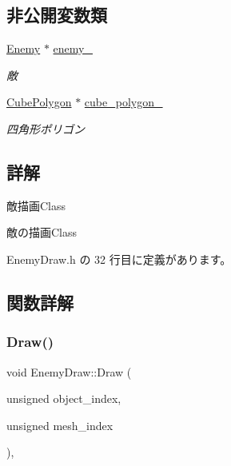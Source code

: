 \subsection*{非公開変数類}
\begin{DoxyCompactItemize}
\item 
\mbox{\hyperlink{class_enemy}{Enemy}} $\ast$ \mbox{\hyperlink{class_enemy_draw_a95b8a7f07e810d1347f1704669c8f790}{enemy\+\_\+}}
\begin{DoxyCompactList}\small\item\em 敵 \end{DoxyCompactList}\item 
\mbox{\hyperlink{class_cube_polygon}{Cube\+Polygon}} $\ast$ \mbox{\hyperlink{class_enemy_draw_a4f35f850ee5e41bb43fc6979e83589dd}{cube\+\_\+polygon\+\_\+}}
\begin{DoxyCompactList}\small\item\em 四角形ポリゴン \end{DoxyCompactList}\end{DoxyCompactItemize}


\subsection{詳解}
敵描画\+Class 

敵の描画\+Class 

 Enemy\+Draw.\+h の 32 行目に定義があります。



\subsection{関数詳解}
\mbox{\label{class_enemy_draw_a20a23c1c5fd5e510d15e8ca27aabd821}} 
\subsubsection{\texorpdfstring{Draw()}{Draw()}}
{\footnotesize\ttfamily void Enemy\+Draw\+::\+Draw (\begin{DoxyParamCaption}\item[{unsigned}]{object\+\_\+index,  }\item[{unsigned}]{mesh\+\_\+index }\end{DoxyParamCaption})\hspace{0.3cm}{\ttfamily [override]}, {\ttfamily [virtual]}}



